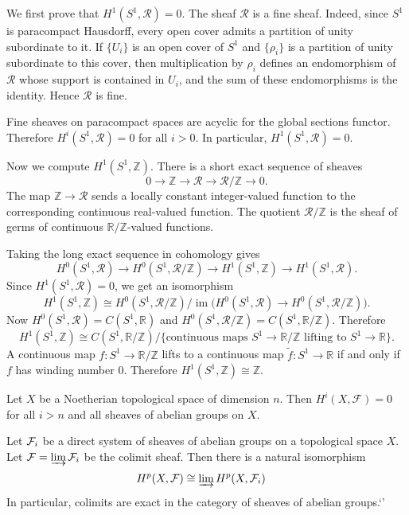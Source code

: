 \documentclass[12pt]{article}
\begin{document}
\begin{solution}
    We first prove that $H^1(S^1,\mathcal R)=0$. The sheaf $\mathcal R$ is a fine sheaf. Indeed, since $S^1$ is paracompact Hausdorff, every open cover admits a partition of unity subordinate to it. If $\{U_i\}$ is an open cover of $S^1$ and $\{\rho_i\}$ is a partition of unity subordinate to this cover, then multiplication by $\rho_i$ defines an endomorphism of $\mathcal R$ whose support is contained in $U_i$, and the sum of these endomorphisms is the identity. Hence $\mathcal R$ is fine.

    Fine sheaves on paracompact spaces are acyclic for the global sections functor. Therefore $H^i(S^1,\mathcal R)=0$ for all $i>0$. In particular, $H^1(S^1,\mathcal R)=0$.

    Now we compute $H^1(S^1,\mathbb Z)$. There is a short exact sequence of sheaves
    \[
        0\to \mathbb Z\to \mathcal R\to \mathcal R/\mathbb Z\to 0.
    \]
    The map $\mathbb Z\to \mathcal R$ sends a locally constant integer-valued function to the corresponding continuous real-valued function. The quotient $\mathcal R/\mathbb Z$ is the sheaf of germs of continuous $\mathbb R/\mathbb Z$-valued functions.

    Taking the long exact sequence in cohomology gives
    \[
        H^0(S^1,\mathcal R)\to H^0(S^1,\mathcal R/\mathbb Z)\to H^1(S^1,\mathbb Z)\to H^1(S^1,\mathcal R).
    \]
    Since $H^1(S^1,\mathcal R)=0$, we get an isomorphism
    \[
        H^1(S^1,\mathbb Z)\cong H^0(S^1,\mathcal R/\mathbb Z)/\operatorname{im}\bigl(H^0(S^1,\mathcal R)\to H^0(S^1,\mathcal R/\mathbb Z)\bigr).
    \]
    Now $H^0(S^1,\mathcal R)=C(S^1,\mathbb R)$ and $H^0(S^1,\mathcal R/\mathbb Z)=C(S^1,\mathbb R/\mathbb Z)$. Therefore
    \[
        H^1(S^1,\mathbb Z)\cong C(S^1,\mathbb R/\mathbb Z)/\{\text{continuous maps }S^1\to \mathbb R/\mathbb Z\text{ lifting to }S^1\to \mathbb R\}.
    \]
    A continuous map $f:S^1\to \mathbb R/\mathbb Z$ lifts to a continuous map $\widetilde f:S^1\to \mathbb R$ if and only if $f$ has winding number $0$. Therefore $H^1(S^1,\mathbb Z)\cong \mathbb Z$.
\end{solution}
\begin{theorem}
    Let $X$ be a Noetherian topological space of dimension $n$. Then $H^i(X, \mathcal{F}) = 0$ for all $i > n$ and all sheaves of abelian groups on $X$.
\end{theorem}

\begin{theorem}
    Let ${\mathcal{F}}_i$ be a direct system of sheaves of abelian groups on a topological space $X$. Let ${\mathcal{F}} = \varinjlim {\mathcal{F}}_i$ be the colimit sheaf. Then there is a natural isomorphism
    \begin{align*}
        H^p(X, {\mathcal{F}}) & \cong \varinjlim H^p(X, {\mathcal{F}}_i)
    \end{align*} In particular, colimits are exact in the category of sheaves of abelian groups.`'
\end{theorem}
\end{document}
